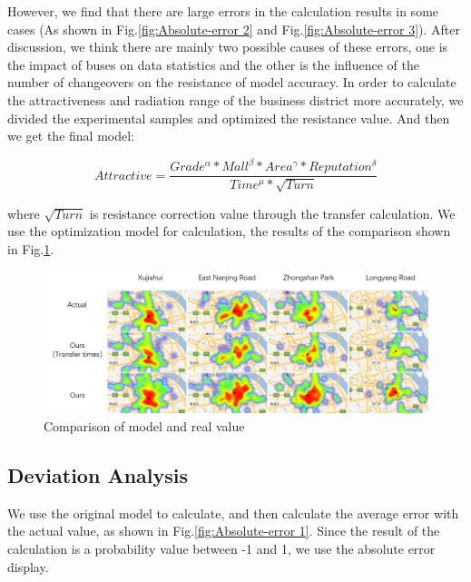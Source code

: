 \documentclass[journal,transmag]{IEEEtran}
\begin{document}
However, we find that there are large errors in the calculation results in some cases (As shown in Fig.\ref{fig:Absolute-error 2} and Fig.\ref{fig:Absolute-error 3}). After discussion, we think there are mainly two possible causes of these errors, one is the impact of buses on data statistics and the other is the influence of the number of changeovers on the resistance of model accuracy. In order to calculate the attractiveness and radiation range of the business district more accurately, we divided the experimental samples and optimized the resistance value. And then we get the final model:

\begin{equation}
Attractive=\frac{Grade^{\alpha}*Mall^{\beta}*Area^{\gamma}*Reputation^{\delta}}{Time^{\mu}*\sqrt{Turn}}
\end{equation}

where $\sqrt{Turn}$ is resistance correction value through the transfer calculation. We use the optimization model for calculation, the results of the comparison shown in Fig.\ref{fig:Comparison-real-value}. 

\begin{figure}[tb]
\centering
\includegraphics[width=1\columnwidth]{figure9.png}
\caption{Comparison of model and real value}
\label{fig:Comparison-real-value}
\end{figure}















\subsection{Deviation Analysis}

We use the original model to calculate, and then calculate the average error with the actual value, as shown in Fig.\ref{fig:Absolute-error 1}. Since the result of the calculation is a probability value between -1 and 1, we use the absolute error display.
\end{document}
